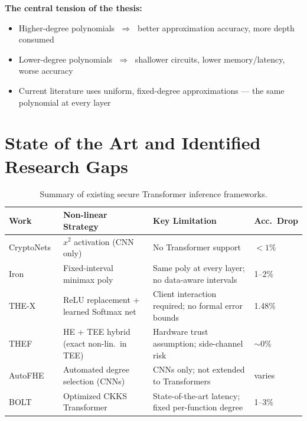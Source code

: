 \documentclass[12pt, a4paper]{article}
\begin{document}
\textbf{The central tension of the thesis:}
\begin{itemize}[leftmargin=2em]
  \item Higher-degree polynomials $\;\Rightarrow\;$ better approximation accuracy, more depth consumed
  \item Lower-degree polynomials $\;\Rightarrow\;$ shallower circuits, lower memory/latency, worse accuracy
  \item Current literature uses uniform, fixed-degree approximations — the same polynomial at every layer
\end{itemize}

\section{State of the Art and Identified Research Gaps}

\begin{table}[ht]
\centering
\caption{Summary of existing secure Transformer inference frameworks.}
\label{tab:related}
\renewcommand{\arraystretch}{1.3}
\begin{tabularx}{\textwidth}{lXXl}
\toprule
\textbf{Work} & \textbf{Non-linear Strategy} & \textbf{Key Limitation} & \textbf{Acc.\ Drop} \\
\midrule
CryptoNets~\cite{cryptonets} & $x^2$ activation (CNN only) & No Transformer support & $<1\%$ \\
Iron~\cite{iron}             & Fixed-interval minimax poly & Same poly at every layer; no data-aware intervals & 1--2\% \\
THE-X~\cite{thex}            & ReLU replacement + learned Softmax net & Client interaction required; no formal error bounds & 1.48\% \\
THEF~\cite{thef}             & HE + TEE hybrid (exact non-lin.\ in TEE) & Hardware trust assumption; side-channel risk & $\sim$0\% \\
AutoFHE~\cite{autofhe}       & Automated degree selection (CNNs) & CNNs only; not extended to Transformers & varies \\
BOLT~\cite{bolt}             & Optimized CKKS Transformer & State-of-the-art latency; fixed per-function degree & 1--3\% \\
\bottomrule
\end{tabularx}
\end{table}
\end{document}
